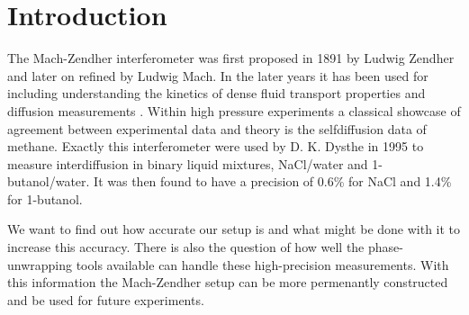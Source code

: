 \section {Introduction}
  The Mach-Zendher interferometer was first proposed in 1891 by Ludwig Zendher
  \cite{lz} and later on refined by Ludwig Mach\cite{lm}.
  In the later years it has been used for including understanding the kinetics of dense
  fluid transport properties\cite{th,dym} and diffusion measurements \cite{dag}.
  Within high pressure experiments a classical showcase of agreement between
  experimental data and theory is the selfdiffusion data of methane\cite{ht,ew}.
  Exactly this interferometer were used by D. K. Dysthe in 1995 to measure interdiffusion
  in binary liquid mixtures, NaCl/water and 1-butanol/water. It was then found to 
  have a precision of 0.6\% for NaCl and 1.4\% for 1-butanol\cite{dag}.

  We want to find out how accurate our setup is and what might be
  done with it to increase this accuracy. There is also the question of how well
  the phase-unwrapping tools available can handle these high-precision measurements.
  With this information the Mach-Zendher setup can be more permenantly constructed 
  and be used for future experiments.
  
